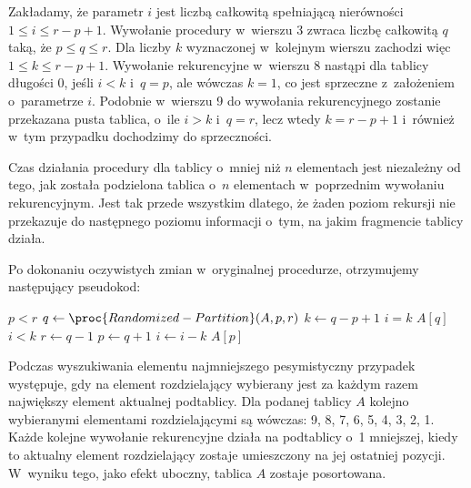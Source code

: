 
\exercise %
Zakładamy, że parametr $i$ jest liczbą całkowitą spełniającą nierówności $1\le i\le r-p+1$.
Wywołanie procedury  w~wierszu 3 zwraca liczbę całkowitą $q$ taką, że $p\le q\le r$.
Dla liczby $k$ wyznaczonej w~kolejnym wierszu zachodzi więc $1\le k\le r-p+1$.
Wywołanie rekurencyjne w~wierszu 8 nastąpi dla tablicy długości 0, jeśli $i<k$ i~$q=p$, ale wówczas $k=1$, co jest sprzeczne z~założeniem o~parametrze $i$.
Podobnie w~wierszu 9 do wywołania rekurencyjnego zostanie przekazana pusta tablica, o~ile $i>k$ i~$q=r$, lecz wtedy $k=r-p+1$ i~również w~tym przypadku dochodzimy do sprzeczności.

\exercise %
Czas działania procedury  dla tablicy o~mniej niż $n$ elementach jest niezależny od tego, jak została podzielona tablica o~$n$ elementach w~poprzednim wywołaniu rekurencyjnym.
Jest tak przede wszystkim dlatego, że żaden poziom rekursji nie przekazuje do następnego poziomu informacji o~tym, na jakim fragmencie tablicy działa.

\exercise %
Po dokonaniu oczywistych zmian w~oryginalnej procedurze, otrzymujemy następujący pseudokod:
\begin{codebox}
\li	\While $p<r$
\li		\Do $q\gets\proc{Randomized-Partition}(A,p,r)$
\li			$k\gets q-p+1$
\li			\If $i=k$
\li				\Then \Return $A[q]$
				\End
\li			\If $i<k$
\li				\Then $r\gets q-1$
\li				\Else $p\gets q+1$
\li					$i\gets i-k$
				\End
		\End
\li	\Return $A[p]$
\end{codebox}

\exercise %
Podczas wyszukiwania elementu najmniejszego pesymistyczny przypadek występuje, gdy na element rozdzielający wybierany jest za każdym razem największy element aktualnej podtablicy.
Dla podanej tablicy $A$ kolejno wybieranymi elementami rozdzielającymi są wówczas: 9, 8, 7, 6, 5, 4, 3, 2, 1.
Każde kolejne wywołanie rekurencyjne działa na podtablicy o~1 mniejszej, kiedy to aktualny element rozdzielający zostaje umieszczony na jej ostatniej pozycji.
W~wyniku tego, jako efekt uboczny, tablica $A$ zostaje posortowana.
